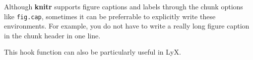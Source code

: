 \documentclass{article}\usepackage[]{graphicx}\usepackage[]{color}
\begin{document}
Although \textbf{knitr} supports figure captions and labels through the
chunk options like \texttt{fig.cap}, sometimes it can be preferrable to
explicitly write these environments. For example, you do not have to write a
really long figure caption in the chunk header in one line.

This hook function can also be particularly useful in LyX.
\end{document}

